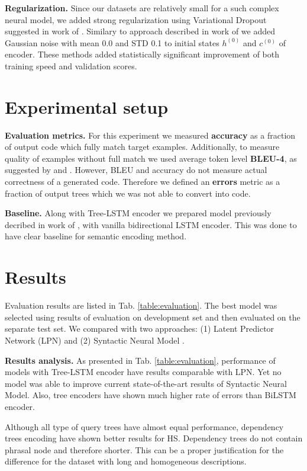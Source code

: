 \textbf{Regularization.} Since our datasets are relatively small for  a such complex neural model, we added strong regularization using Variational Dropout suggested in work of \cite{Gal2016}. Similary to approach described in work of \cite{zimmermann2012} we added Gaussian noise with mean 0.0 and STD 0.1 to initial states $h^{(0)}$ and $c^{(0)}$ of encoder. These methods added statistically significant improvement of both training speed and validation scores.

\section{Experimental setup} \label{exp_setup}

\textbf{Evaluation metrics.} For this experiment we measured \textbf{accuracy} as a fraction of output code which fully match target examples. Additionally, to measure quality of examples without full match we used average token level \textbf{BLEU-4}, as suggested by \cite{Ling2016} and \cite{Yin2017}. However, BLEU and accuracy do not measure actual correctness of a generated code. Therefore we defined an \textbf{errors} metric as a fraction of output trees which we was not able to convert into code.

\textbf{Baseline.} Along with Tree-LSTM encoder we prepared model previously decribed in work of \cite{Yin2017}, with vanilla bidirectional LSTM encoder. This was done to have clear baseline for semantic encoding method. 

\section{Results}
Evaluation results are listed in Tab. \ref{table:evaluation}. The best model was selected using results of evaluation on development set and then evaluated on the separate test set. We compared with two approaches: (1) Latent Predictor Network (LPN) \parencite{Ling2016} and (2) Syntactic Neural Model \parencite{Yin2017}. 

\textbf{Results analysis.} As presented in Tab. \ref{table:evaluation}, performance of models with Tree-LSTM encoder have results comparable with LPN. Yet no model was able to improve current state-of-the-art results of Syntactic Neural Model. Also, tree encoders have shown much higher rate of errors than BiLSTM encoder.

Although all type of query trees have almost equal performance, dependency trees encoding have shown better results for HS. Dependency trees do not contain phrasal node and therefore shorter. This can be a proper justification for the difference for the dataset with long and homogeneous descriptions.

